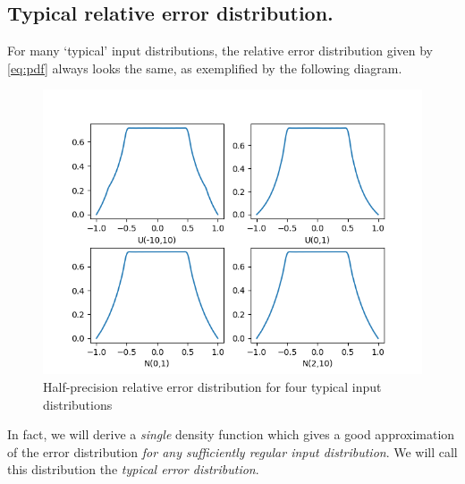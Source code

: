 \documentclass[10pt,a4paper]{article}
\theoremstyle{plain}
\theoremstyle{definition}
\begin{document}
\subsection{Typical relative error distribution.}

For many `typical' input distributions, the relative error distribution given by \eqref{eq:pdf}  always looks the same, as exemplified by the following diagram.

\begin{figure}[h!]
\begin{center}
\includegraphics[scale=0.75]{Code/pics/several_examples}
\end{center}
\caption{Half-precision relative error distribution for four typical input distributions}
\label{fig:errdist}
\end{figure}

In fact, we will derive a \emph{single} density function which gives a good approximation of the error distribution \emph{for any sufficiently regular input distribution}. We will call this distribution the \emph{typical error distribution}.
\end{document}
